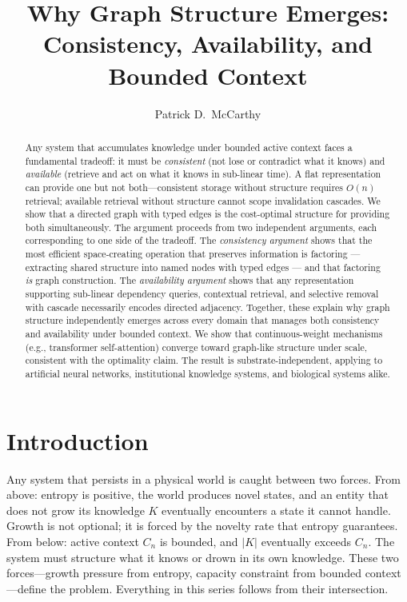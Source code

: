 \documentclass[11pt]{article}
\title{Why Graph Structure Emerges:\\Consistency, Availability, and Bounded Context}
\author{Patrick D.\ McCarthy}
\date{}
\theoremstyle{definition}
\begin{document}
\maketitle

\begin{abstract}
Any system that accumulates knowledge under bounded active context
faces a fundamental tradeoff: it must be \emph{consistent}
(not lose or contradict what it knows) and \emph{available}
(retrieve and act on what it knows in sub-linear time). A flat
representation can provide one but not both---consistent storage
without structure requires $O(n)$ retrieval; available retrieval
without structure cannot scope invalidation cascades.
We show that a directed graph with typed edges is the cost-optimal
structure for providing both simultaneously. The argument proceeds
from two independent arguments, each corresponding to one side of
the tradeoff. The \emph{consistency argument} shows that the most efficient
space-creating operation that preserves information is factoring
--- extracting shared structure into named nodes with typed edges ---
and that factoring \emph{is} graph construction. The
\emph{availability argument} shows that any representation supporting
sub-linear dependency queries, contextual retrieval, and selective
removal with cascade necessarily encodes directed adjacency.
Together, these explain why graph structure independently emerges
across every domain that manages both consistency and availability
under bounded context.
We show that continuous-weight mechanisms (e.g., transformer
self-attention) converge toward graph-like structure under scale,
consistent with the optimality claim. The result is substrate-independent, applying
to artificial neural networks, institutional knowledge systems, and
biological systems alike.
\end{abstract}

\section{Introduction}
\label{sec:intro}

Any system that persists in a physical world is caught between two
forces. From above: entropy is positive, the world produces novel
states, and an entity that does not grow its knowledge $K$ eventually
encounters a state it cannot handle. Growth is not optional; it is
forced by the novelty rate that entropy guarantees. From below:
active context $C_n$ is bounded, and $|K|$ eventually exceeds $C_n$.
The system must structure what it knows or drown in its own
knowledge. These two forces---growth pressure from entropy, capacity
constraint from bounded context---define the problem. Everything in
this series follows from their intersection.
\end{document}
